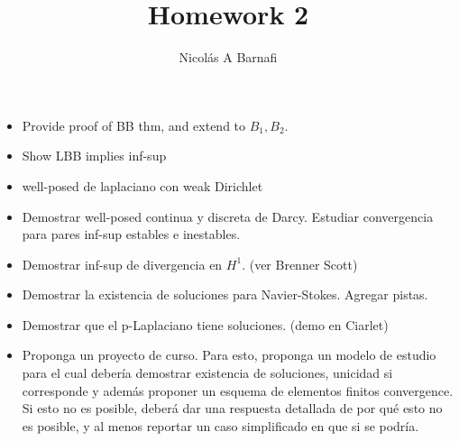 \documentclass{article}
\title{Homework 2}
\author{Nicol\'as A Barnafi}
\begin{document}
\maketitle

\begin{itemize}
    \item Provide proof of BB thm, and extend to $B_1,B_2$. 
    \item Show LBB implies inf-sup
    \item well-posed de laplaciano con weak Dirichlet
    \item Demostrar well-posed continua y discreta de Darcy. Estudiar convergencia para pares inf-sup estables e inestables. 
    \item Demostrar inf-sup de divergencia en $H^1$. (ver Brenner Scott)
    \item Demostrar la existencia de soluciones para Navier-Stokes. Agregar pistas.
    \item Demostrar que el p-Laplaciano tiene soluciones. (demo en Ciarlet)
    \item Proponga un proyecto de curso. Para esto, proponga un modelo de estudio para el cual debería demostrar existencia de soluciones, unicidad si corresponde y además proponer un esquema de elementos finitos convergence. Si esto no es posible, deberá dar una respuesta detallada de por qué esto no es posible, y al menos reportar un caso simplificado en que si se podría. 
\end{itemize}
\end{document}
